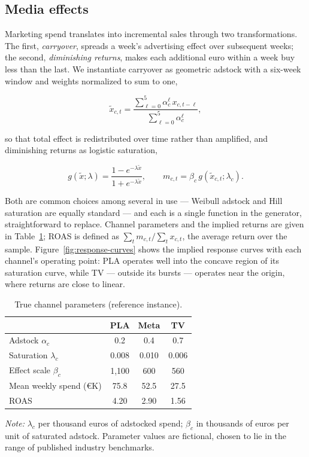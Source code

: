 \documentclass[
  conference]{IEEEtran}
\begin{document}
\subsection{Media effects}\label{media-effects}

Marketing spend translates into incremental sales through two
transformations. The first, \emph{carryover}, spreads a week's
advertising effect over subsequent weeks; the second, \emph{diminishing
returns}, makes each additional euro within a week buy less than the
last. We instantiate carryover as geometric adstock with a six-week
window and weights normalized to sum to one,

\[\tilde{x}_{c,t} = \frac{\sum_{\ell=0}^{5} \alpha_c^{\ell}\, x_{c,t-\ell}}{\sum_{\ell=0}^{5} \alpha_c^{\ell}}, \tag{7}\]

so that total effect is redistributed over time rather than amplified,
and diminishing returns as logistic saturation,

\[g(\tilde{x}; \lambda) = \frac{1 - e^{-\lambda \tilde{x}}}{1 + e^{-\lambda \tilde{x}}}, \qquad m_{c,t} = \beta_c\, g(\tilde{x}_{c,t}; \lambda_c). \tag{8}\]

Both are common choices among several in use --- Weibull adstock and
Hill saturation are equally standard --- and each is a single function
in the generator, straightforward to replace. Channel parameters and the
implied returns are given in Table~\ref{tbl:channels}; ROAS is defined
as \(\sum_t m_{c,t} / \sum_t x_{c,t}\), the average return over the
sample. Figure~\ref{fig:response-curves} shows the implied response
curves with each channel's operating point: PLA operates well into the
concave region of its saturation curve, while TV --- outside its bursts
--- operates near the origin, where returns are close to linear.

\begin{table}[!htbp]
\centering
\footnotesize
\caption{True channel parameters (reference instance).}\label{tbl:channels}
\begin{tabular}{@{}lccc@{}}
\toprule
 & PLA & Meta & TV \\
\midrule
Adstock $\alpha_c$ & 0.2 & 0.4 & 0.7 \\
Saturation $\lambda_c$ & 0.008 & 0.010 & 0.006 \\
Effect scale $\beta_c$ & 1,100 & 600 & 560 \\
Mean weekly spend (€K) & 75.8 & 52.5 & 27.5 \\
ROAS & 4.20 & 2.90 & 1.56 \\
\bottomrule
\end{tabular}
\par\vspace{0.8em}
\begin{minipage}{\columnwidth}
\footnotesize
\textit{Note:} $\lambda_c$ per thousand euros of adstocked spend; $\beta_c$ in thousands of euros per unit of saturated adstock. Parameter values are fictional, chosen to lie in the range of published industry benchmarks.
\end{minipage}
\end{table}
\end{document}
